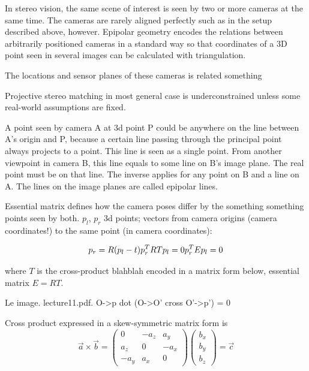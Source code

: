 In stereo vision, the same scene of interest is seen by two or more cameras at the same time.
The cameras are rarely aligned perfectly such as in the setup described above, however.
Epipolar geometry encodes the relations between arbitrarily positioned cameras in a standard way so that coordinates of a 3D point seen in several images can be calculated with triangulation.

The locations and sensor planes of these cameras is related something

Projective stereo matching in most general case is underconstrained unless some real-world assumptions are fixed.



A point seen by camera A at 3d point P could be anywhere on the line between A's origin and P, because a certain line passing through the principal point always projects to a point.
This line is seen as a single point.
From another viewpoint in camera B, this line equals to some line on B's image plane.
The real point must be on that line.
The inverse applies for any point on B and a line on A.
The lines on the image planes are called epipolar lines.


Essential matrix defines how the camera poses differ by the something something points seen by both. $p_l$, $p_r$ 3d points; vectors from camera origins (camera coordinates!) to the same point (in camera coordinates):

\[ \label{eq:essential}
	p_r = R (p_l - t) \\
	p_r^T R T p_l = 0 \\
	p_r^T E p_l = 0
\]

where $T$ is the cross-product blahblah encoded in a matrix form below, essential matrix $E = R T$.

Le image. lecture11.pdf. O->p dot (O->O' cross O'->p') = 0

Cross product expressed in a skew-symmetric matrix form is
\begin{equation}
\vec a \times \vec b =
\begin{pmatrix}
	 0   & -a_z &  a_y\\
	 a_z &  0   & -a_x\\
	-a_y &  a_x & 0
\end{pmatrix}
\begin{pmatrix}
	b_x\\b_y\\b_z
\end{pmatrix}
= \vec c
\end{equation}

